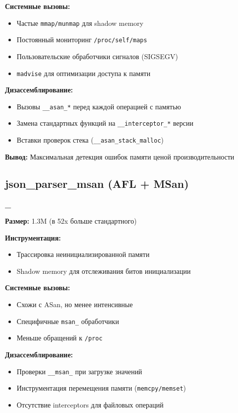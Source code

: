     \textbf{Системные вызовы:}
    \begin{itemize}
        \item Частые \texttt{mmap/munmap} для shadow memory
        \item Постоянный мониторинг \texttt{/proc/self/maps}
        \item Пользовательские обработчики сигналов (SIGSEGV)
        \item \texttt{madvise} для оптимизации доступа к памяти
    \end{itemize}

    \textbf{Дизассемблирование:}
    \begin{itemize}
        \item Вызовы \texttt{\_\_asan\_*} перед каждой операцией с памятью
        \item Замена стандартных функций на \texttt{\_\_interceptor\_*} версии
        \item Вставки проверок стека (\texttt{\_\_asan\_stack\_malloc})
    \end{itemize}

    \textbf{Вывод:} Максимальная детекция ошибок памяти ценой производительности

    \subsection{json\_parser\_msan (AFL + MSan)}
    \textbf{\_}

    \textbf{Размер:} 1.3M (в 52x больше стандартного)

    \textbf{Инструментация:}
    \begin{itemize}
        \item Трассировка неинициализированной памяти
        \item Shadow memory для отслеживания битов инициализации
    \end{itemize}

    \textbf{Системные вызовы:}
    \begin{itemize}
        \item Схожи с ASan, но менее интенсивные
        \item Специфичные \texttt{msan\_} обработчики
        \item Меньше обращений к \texttt{/proc}
    \end{itemize}

    \textbf{Дизассемблирование:}
    \begin{itemize}
        \item Проверки \texttt{\_\_msan\_} при загрузке значений
        \item Инструментация перемещения памяти (\texttt{memcpy/memset})
        \item Отсутствие interceptors для файловых операций
    \end{itemize}

